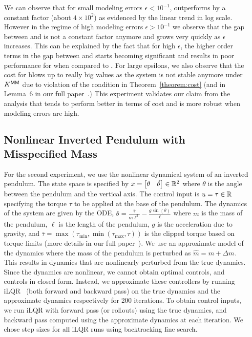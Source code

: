 We can observe that for small modeling errors $\epsilon < 10^{-1}$, \ILC{}
outperforms \MM{} by a constant factor (about $4\times 10^{2}$) as evidenced by the linear
trend in log scale. However in the regime of high modeling errors
$\epsilon > 10^{-1}$ we observe that the gap between \ILC{} and \MM{} is not a
constant factor anymore and grows very quickly as $\epsilon$ increases. This can
be explained by the fact that for high $\epsilon$, the
higher order terms in the gap between \ILC{} and \MM{} starts becoming significant
and results in poor performance for \MM{} when compared to \ILC{}. For large epsilons,
we also observe that the cost for \MM{} blows up to really big values as the system
is not stable anymore under $K^\mathsf{MM}$ due to violation of the condition
in Theorem~\ref{theorem:cost} (and in
Lemma~6 in our full paper~\cite{DBLP:journals/corr/abs-2111-09434}.) This experiment validates our claim from the
analysis that \ILC{} tends to perform better in terms of cost and is more robust
when modeling errors are high.

\subsection{Nonlinear Inverted Pendulum with Misspecified Mass}
\label{sec:invert-pend-with}

For the second experiment, we use the nonlinear dynamical system of an inverted
pendulum. The state space is specified by $x =
\begin{bmatrix}
  \theta &
  \dot{\theta}
\end{bmatrix} \in \mathbb{R}^{2}
$ where $\theta$ is the angle between the pendulum and the vertical axis. The
control input is $u = \tau \in \mathbb{R}$ specifying the torque $\tau$ to be
applied at the base of the pendulum. The dynamics of the system are
given by the ODE,
$\ddot{\theta} = \frac{\bar{\tau}}{m\ell^{2}} - \frac{g\sin(\theta)}{\ell}$
where $m$ is the mass of the pendulum, $\ell$ is the length of the pendulum, $g$
is the acceleration due to gravity, and
$\bar{\tau} = \max(\tau_{\min}, \min(\tau_{\max}, \tau))$ is the clipped torque
based on torque limits (more details in
our full paper~\cite{DBLP:journals/corr/abs-2111-09434}). 
We use an approximate model of the dynamics where the mass of the pendulum is
perturbed as $\hat{m} = m + \Delta m$.
This results in dynamics that are nonlinearly perturbed from the true dynamics.
Since the dynamics are nonlinear, we cannot obtain
optimal controls, and \MM{} controls in closed form. Instead, we approximate these
controllers by running iLQR~\cite{li04} (both forward and backward pass) on the
true dynamics and the approximate
dynamics respectively for $200$ iterations. To obtain \ILC{} control inputs, we run
iLQR with forward pass (or rollouts)
using the true dynamics, and backward pass computed using the approximate
dynamics at each iteration.
We chose step sizes for all iLQR runs using
backtracking line search.

